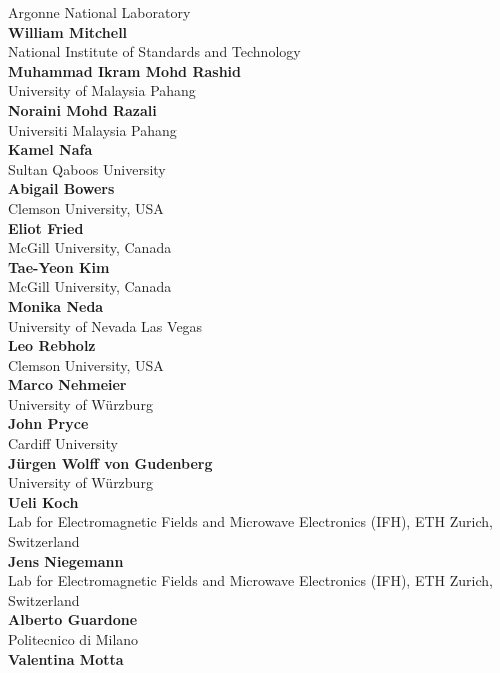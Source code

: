 \documentclass[article,A4,11pt]{llncs}%
\begin{document}
    Argonne National Laboratory\\
        \noindent
    {\bf William Mitchell}\\
    National Institute of Standards and Technology\\
        \noindent
    {\bf Muhammad Ikram Mohd Rashid}\\
    University of Malaysia Pahang\\
        \noindent
    {\bf Noraini Mohd Razali}\\
    Universiti Malaysia Pahang\\
        \noindent
    {\bf Kamel Nafa}\\
    Sultan Qaboos University\\
        \noindent
    {\bf Abigail Bowers}\\
    Clemson University, USA\\
        \noindent
    {\bf Eliot Fried}\\
    McGill University, Canada\\
        \noindent
    {\bf Tae-Yeon Kim}\\
    McGill University, Canada\\
        \noindent
    {\bf Monika Neda}\\
    University of Nevada Las Vegas\\
        \noindent
    {\bf Leo Rebholz}\\
    Clemson University, USA\\
        \noindent
    {\bf Marco Nehmeier}\\
    University of W\"urzburg\\
        \noindent
    {\bf John Pryce}\\
    Cardiff University\\
        \noindent
    {\bf J\"urgen Wolff von Gudenberg}\\
    University of W\"urzburg\\
        \noindent
    {\bf Ueli Koch}\\
    Lab for Electromagnetic Fields and Microwave Electronics (IFH), ETH Zurich, Switzerland\\
        \noindent
    {\bf Jens Niegemann}\\
    Lab for Electromagnetic Fields and Microwave Electronics (IFH), ETH Zurich, Switzerland\\
        \noindent
    {\bf Alberto Guardone}\\
    Politecnico di Milano\\
        \noindent
    {\bf Valentina Motta}\\
\end{document}
